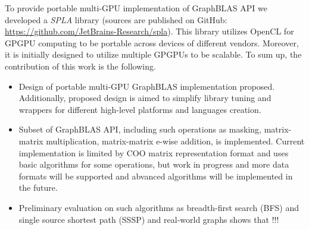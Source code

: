 To provide portable multi-GPU implementation of GraphBLAS API we developed a \textit{SPLA} library (sources are published on GitHub: \url{https://github.com/JetBrains-Research/spla}).
This library utilizes OpenCL for GPGPU computing to be portable across devices of different vendors.
Moreover, it is initially designed to utilize multiple GPGPUs to be scalable.
To sum up, the contribution of this work is the following.
\begin{itemize}
    \item Design of portable multi-GPU GraphBLAS implementation proposed. Additionally, proposed design is aimed to simplify library tuning and wrappers for different high-level platforms and languages creation. 
    \item Subset of GraphBLAS API, including such operations as masking, matrix-matrix multiplication, matrix-matrix e-wise addition, is implemented. Current implementation is limited by COO matrix representation format and uses basic algorithms for some operations, but work in progress and more data formats will be supported and abvanced algorithms will be implemented in the future.
    \item Preliminary evaluation on such algorithms as breadth-first search (BFS) and single source shortest path (SSSP) and real-world graphs shows that !!!
\end{itemize} 